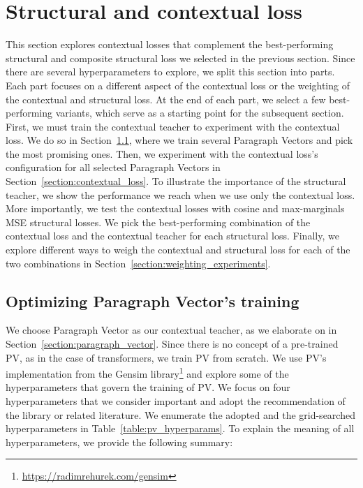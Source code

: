 \section{Structural and contextual loss}\label{section:structural_and_contextual}

This section explores contextual losses that complement the best-performing
structural and composite structural loss we selected in the previous section.
Since there are several hyperparameters to explore, we split this section into
parts. Each part focuses on a different aspect of the contextual loss or the
weighting of the contextual and structural loss. At the end of each part, we
select a few best-performing variants, which serve as a starting point for the
subsequent section. First, we must train the contextual teacher to experiment
with the contextual loss. We do so in Section~\ref{section:pv_training}, where
we train several Paragraph Vectors and pick the most promising ones. Then, we
experiment with the contextual loss's configuration for all selected Paragraph
Vectors in Section~\ref{section:contextual_loss}. To illustrate the importance
of the structural teacher, we show the performance we reach when we use only
the contextual loss. More importantly, we test the contextual losses with
cosine and max-marginals MSE structural losses. We pick the best-performing
combination of the contextual loss and the contextual teacher for each
structural loss. Finally, we explore different ways to weigh the contextual and
structural loss for each of the two combinations in
Section~\ref{section:weighting_experiments}.

\subsection{Optimizing Paragraph Vector's training}\label{section:pv_training}

We choose Paragraph Vector \citep{le2014distributed} as our contextual teacher,
as we elaborate on in Section~\ref{section:paragraph_vector}. Since there is no
concept of a pre-trained PV, as in the case of transformers, we train PV from
scratch. We use PV's implementation from the Gensim
library\footnote{\label{fn:link_to_gensim}\url{https://radimrehurek.com/gensim}}
and explore some of the hyperparameters that govern the training of PV. We
focus on four hyperparameters that we consider important and adopt the
recommendation of the library or related literature. We enumerate the adopted
and the grid-searched hyperparameters in Table~\ref{table:pv_hyperparams}. To
explain the meaning of all hyperparameters, we provide the following summary:


